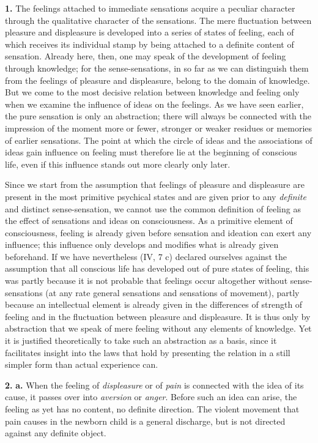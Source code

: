 \documentclass[12pt,a4paper]{book}
\newcommand{\opage}[1]{\marginnote{\footnotesize\textit{[#1]}}}
\begin{document}
\noindent\textbf{1.} The feelings attached to immediate sensations
acquire a peculiar character through the qualitative character of the
sensations. The mere fluctuation between pleasure and displeasure is
developed into a series of states of feeling, each of which receives its
individual stamp by being attached to a definite content of sensation.
Already here, then, one may speak of the development of feeling through
knowledge; for the sense-sensations, in so far as we can distinguish
them from the feelings of pleasure and displeasure, belong to the domain
of knowledge. But we come to the most decisive relation between
knowledge and feeling only when we examine the influence of ideas on the
feelings. As we have seen earlier, the pure sensation is only an
abstraction; there will always be connected with the impression of the
moment more or fewer, stronger or weaker residues or memories of earlier
sensations. The point at which the circle of ideas and the associations
of ideas gain influence on feeling must therefore lie at the beginning
of conscious life, even if this influence stands out more clearly only
later.

Since we start from the assumption that feelings of pleasure and
displeasure are present in the most primitive psychical states and are
given prior to any \emph{definite} and distinct sense-sensation, we
cannot use the common definition of feeling as the effect of sensations
and ideas on consciousness. As a primitive element of consciousness,
feeling is already given before sensation and ideation can exert any
influence; this influence only develops and modifies what
\opage{282}is already given beforehand. If we have nevertheless (IV, 7 c)
declared ourselves against the assumption that all conscious life has
developed out of pure states of feeling, this was partly because it is
not probable that feelings occur altogether without sense-sensations (at
any rate general sensations and sensations of movement), partly because
an intellectual element is already given in the differences of strength
of feeling and in the fluctuation between pleasure and displeasure. It
is thus only by abstraction that we speak of mere feeling without any
elements of knowledge. Yet it is justified theoretically to take such an
abstraction as a basis, since it facilitates insight into the laws that
hold by presenting the relation in a still simpler form than actual
experience can.

\textbf{2.} \textbf{a.} When the feeling of \emph{displeasure} or of
\emph{pain} is connected with the idea of its cause, it passes over into
\emph{aversion} or \emph{anger}. Before such an idea can arise, the
feeling as yet has no content, no definite direction. The violent
movement that pain causes in the newborn child is a general discharge,
but is not directed against any definite object.
\end{document}
